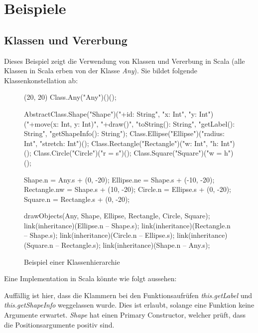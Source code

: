 \chapter{Beispiele}


\section{Klassen und Vererbung}
\label{sec:bspClasses}

Dieses Beispiel zeigt die Verwendung von Klassen und Vererbung in Scala
(alle Klassen in Scala erben von der Klasse \emph{Any}). Sie bildet
folgende Klassenkonstellation ab:


\begin{figure}[H]
	\centering
	\begin{emp}[classdiag](20, 20)
		Class.Any("Any")()();

		AbstractClass.Shape("Shape")("+id: String", "x: Int", "y: Int")
			("+move(x: Int, y: Int)", "+draw()", "toString(): String", "getLabel(): String", "getShapeInfo(): String");
		Class.Ellipse("Ellipse")("radius: Int", "stretch: Int")();
		Class.Rectangle("Rectangle")("w: Int", "h: Int")();
		Class.Circle("Circle")("{r = s}")();
		Class.Square("Square")("{w = h}")();

		Shape.n = Any.s + (0, -20);
		Ellipse.ne = Shape.s + (-10, -20);
		Rectangle.nw = Shape.s + (10, -20);
		Circle.n = Ellipse.s + (0, -20);
		Square.n = Rectangle.s + (0, -20);

		drawObjects(Any, Shape, Ellipse, Rectangle, Circle, Square);
		link(inheritance)(Ellipse.n -- Shape.s);
		link(inheritance)(Rectangle.n -- Shape.s);
		link(inheritance)(Circle.n -- Ellipse.s);
		link(inheritance)(Square.n -- Rectangle.s);
		link(inheritance)(Shape.n -- Any.s);

	\end{emp}
	\caption{Beispiel einer Klassenhierarchie}
	\label{fig:covariance}
\end{figure}

Eine Implementation in Scala könnte wie folgt aussehen: 



Auffällig ist hier, dass die Klammern bei den Funktionsaufrüfen \emph{this.getLabel} 
und \emph{this.getShapeInfo} weggelassen wurde. Dies ist erlaubt, solange eine Funktion
keine Argumente erwartet. \emph{Shape} hat einen Primary Constructor, welcher prüft,
dass die Positionsargumente positiv sind.

